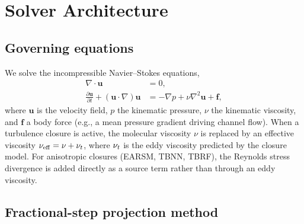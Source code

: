 \section{Solver Architecture}
\label{sec:solver}

\subsection{Governing equations}

We solve the incompressible Navier--Stokes equations,
\begin{align}
    \nabla \cdot \bm{u} &= 0, \label{eq:continuity} \\
    \frac{\partial \bm{u}}{\partial t} + (\bm{u} \cdot \nabla)\bm{u} &= -\nabla p + \nu \nabla^2 \bm{u} + \bm{f}, \label{eq:momentum}
\end{align}
where $\bm{u}$ is the velocity field, $p$ the kinematic pressure, $\nu$ the kinematic viscosity, and $\bm{f}$ a body force (e.g., a mean pressure gradient driving channel flow).
When a turbulence closure is active, the molecular viscosity $\nu$ is replaced by an effective viscosity $\nu_\mathrm{eff} = \nu + \nu_t$, where $\nu_t$ is the eddy viscosity predicted by the closure model.
For anisotropic closures (EARSM, TBNN, TBRF), the Reynolds stress divergence is added directly as a source term rather than through an eddy viscosity.

\subsection{Fractional-step projection method}

